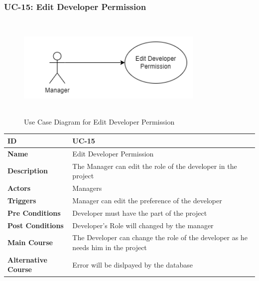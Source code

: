     \subsubsection{UC-15: Edit Developer Permission}
    \begin{figure}[H]
        \includegraphics[height=5cm, width=0.8\textwidth]{./diagrams/Use Case/u15.png}
        \centering 
        \caption{Use Case Diagram for Edit Developer Permission}
        \label{fig:Usecase1}
        \end{figure}
        
    \begin{center}
        \begin{tabularx}{\textwidth}{|l|X|}
            \hline
            \textbf{ID} & UC-15 \\
            \hline
            \textbf{Name} & Edit Developer Permission \\
            \hline
            \textbf{Description} & The Manager can edit the role of the developer in the project \\
            \hline
            \textbf{Actors} & Managers \\
            \hline
            \textbf{Triggers} & Manager can edit the preference of the developer \\
            \hline
            \textbf{Pre Conditions} & Developer must have the part of the project \\
            \hline
            \textbf{Post Conditions} & Developer's Role will changed by the manager \\
            \hline
            \textbf{Main Course} & The Developer can change the role of the developer as he needs him in the project \\
            \hline
            \textbf{Alternative Course} & Error will be dislpayed by the database \\
            \hline
            
        \end{tabularx}
    \end{center}
    \newpage
    

